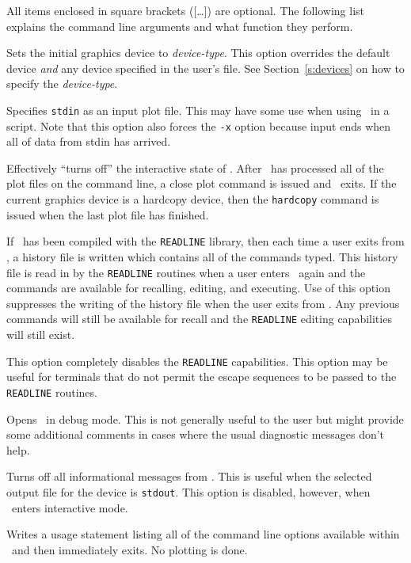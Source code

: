 All items enclosed in square brackets ([\ldots ]) are optional.
The following list explains the command line arguments and
what function they perform.
\begin{description}
  \item [{\tt -d {\em device-type}} --] Sets the initial graphics
    device to {\em device-type}.
    This option overrides the default device {\em and}
    any device specified in the user's \wipinit{} file.
    See Section~\ref{s:devices} on how to specify the {\em device-type}.
  \item [{\tt --} --]  Specifies {\tt stdin} as an input plot file.
    This may have some use when using \wip\ in a script.  Note that this
    option also forces the {\tt -x} option because input ends when all
    of data from stdin has arrived.
  \item [{\tt -x} --]  Effectively ``turns off'' the interactive
    state of \wip.
    After \wip\ has processed all of the plot files on the command line,
    a close plot command is issued and \wip\ exits.
    If the current graphics device is a hardcopy device,
    then the {\tt hardcopy}
    command is issued when the last plot file has finished.
  \item [{\tt -r} --]  If \wip\ has been compiled with the {\tt READLINE}
    library, then each time a user exits from \wip,
    a history file is written which contains all of the commands typed.
    This history file is read in by
    the {\tt READLINE} routines when a user enters \wip\ again and the
    commands are available for recalling, editing, and executing.
    Use of this option suppresses the writing of the history file when
    the user exits from \wip.
    Any previous commands will still be available for recall and the
    {\tt READLINE} editing capabilities will still exist.
  \item [{\tt -b} --]  This option completely disables the {\tt READLINE}
    capabilities.  This option may be useful for terminals that do not
    permit the escape sequences to be passed to the {\tt READLINE} routines.
  \item [{\tt -g} --]  Opens \wip\ in debug mode.  This is not generally
    useful to the user but might provide some additional comments in
    cases where the usual diagnostic messages don't help.
  \item [{\tt -q} --]  Turns off all informational messages from \wip.
    This is useful when the selected output file for the device is {\tt stdout}.
    This option is disabled, however, when \wip\ enters interactive mode.
  \item [{\tt -h} or {\tt -?} --]  Writes a usage statement listing all
    of the command line options available within \wip\ and then
    immediately exits.  No plotting is done.
\end{description}

